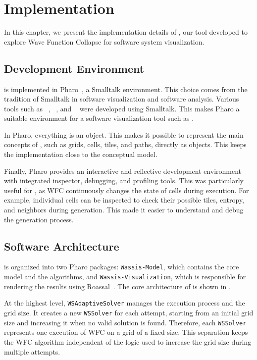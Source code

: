 \documentclass[../../main.tex]{subfiles}
\begin{document}
\chapter{Implementation}
\label{chap:implementation}

In this chapter, we present the implementation details of \wassis, our tool developed to explore Wave Function Collapse for software system visualization.

\section{Development Environment}

\wassis is implemented in Pharo~, a Smalltalk environment. This choice comes from the tradition of Smalltalk in software visualization and software analysis. Various tools such as ~, ~, and ~ were developed using Smalltalk. This makes Pharo a suitable environment for a software visualization tool such as \wassis.

In Pharo, everything is an object. This makes it possible to represent the main concepts of \wassis, such as grids, cells, tiles, and paths, directly as objects. This keeps the implementation close to the conceptual model.

Finally, Pharo provides an interactive and reflective development environment with integrated inspector, debugging, and profiling tools. This was particularly useful for \wassis, as WFC continuously changes the state of cells during execution. For example, individual cells can be inspected to check their possible tiles, entropy, and neighbors during generation. This made it easier to understand and debug the generation process.

\section{Software Architecture}

\wassis is organized into two Pharo packages: \texttt{Wassis-Model}, which contains the core model and the algorithms, and \texttt{Wassis-Visualization}, which is responsible for rendering the results using Roassal~. The core architecture of \wassis is shown in .

At the highest level, \texttt{WSAdaptiveSolver} manages the execution process and the grid size. It creates a new \texttt{WSSolver} for each attempt, starting from an initial grid size and increasing it when no valid solution is found. Therefore, each \texttt{WSSolver} represents one execution of WFC on a grid of a fixed size. This separation keeps the WFC algorithm independent of the logic used to increase the grid size during multiple attempts.
\end{document}
